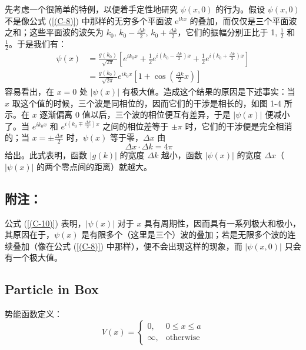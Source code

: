 先考虑一个很简单的特例，以便着手定性地研究 $\psi (x, 0)$ 的行为。假设 $\psi (x, 0)$ 不是像公式 (\ref{(C-8)}) 中那样的无穷多个平面波 $\mathrm{e}^{\mathrm{i}kx}$ 的叠加，而仅仅是三个平面波之和；这些平面波的波矢为 $k_{0}$, $k_{0}-\frac{\Delta k}{2}$, $k_{0}+\frac{\Delta k}{2}$，它们的振幅分别正比于 1, $\frac{1}{2}$ 和 $\frac{1}{2}$。于是我们有：
\begin{equation}
	\begin{aligned}
		\psi(x) &= \frac{g(k_{0})}{\sqrt{2\pi}}\left[e^{i k_{0}x}+\frac{1}{2}e^{i(k_{0}-\frac{\Delta k}{2})x}+\frac{1}{2}e^{i(k_{0}+\frac{\Delta k}{2})x}\right] \\
		&= \frac{g(k_{0})}{\sqrt{2\pi}}e^{ik_{0}x}\left[1+\cos\left(\frac{\Delta k}{2}x\right)\right] \quad \label{(C-10)}
	\end{aligned}
\end{equation}
容易看出，在 $x=0$ 处 $|\psi(x)|$ 有极大值。造成这个结果的原因是下述事实：当 $x$ 取这个值的时候，三个波是同相位的，因而它们的干涉是相长的，如图 1-4 所示。在 $x$ 逐渐偏离 0 值以后，三个波的相位便互有差异，于是 $|\psi(x)|$ 便减小了。当 $e^{ik_{0}x}$ 和 $e^{i(k_{0}\mp\frac{\Delta k}{2})x}$ 之间的相位差等于 $\pm\pi$ 时，它们的干涉便是完全相消的；当 $x=\pm\frac{\Delta x}{2}$ 时，$\psi(x)$ 等于零，$\Delta x$ 由
\begin{equation}
	\Delta x\cdot\Delta k=4\pi \quad \label{(C-11)}
\end{equation}
给出。此式表明，函数 $|g(k)|$ 的宽度 $\Delta k$ 越小，函数 $|\psi(x)|$ 的宽度 $\Delta x$（$|\psi(x)|$ 的两个零点间的距离）就越大。

\subsection*{附注：}
公式 (\ref{(C-10)}) 表明，$|\psi(x)|$ 对于 $x$ 具有周期性，因而具有一系列极大和极小，其原因在于，$\psi(x)$ 是有限多个（这里是三个）波的叠加；若是无限多个波的连续叠加（像在公式 (\ref{(C-8)}) 中那样），便不会出现这样的现象，而 $|\psi(x,0)|$ 只会有一个极大值。


\subsection{Particle in Box}

势能函数定义：
\[
V(x) = 
\begin{cases} 
	0, & 0 \leq x \leq a \\
	\infty, & \text{otherwise}
\end{cases}
\]

